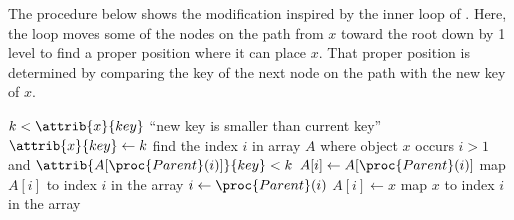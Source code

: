 The procedure below shows the modification inspired by the inner loop of .
Here, the  loop moves some of the nodes on the path from $x$ toward the root down by 1 level to find a proper position where it can place $x$.
That proper position is determined by comparing the key of the next node on the path with the new key of $x$.

\begin{codebox}
\li \If $k<\attrib{x}{key}$
\li     \Then \Error ``new key is smaller than current key''
        \End
\li $\attrib{x}{key}\gets k$
\li find the index $i$ in array $A$ where object $x$ occurs
\li \While $i>1$ and $\attrib{A[\proc{Parent}(i)]}{key}<k$
\li     \Do $A[i]\gets A[\proc{Parent}(i)]$
\li         map $A[i]$ to index $i$ in the array
\li         $i\gets\proc{Parent}(i)$
        \End
\li $A[i]\gets x$
\li map $x$ to index $i$ in the array
\end{codebox}
